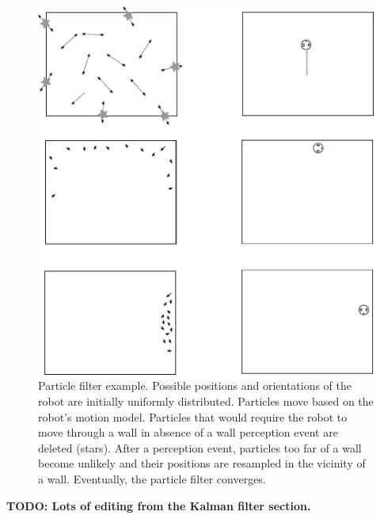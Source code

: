 \begin{figure}
	\centering
		\includegraphics[width=\textwidth]{figs/particlefilter_example}
	\caption{Particle filter example. Possible positions and orientations of the robot are initially uniformly distributed. Particles move based on the robot's motion model. Particles that would require the robot to move through a wall in absence of a wall perception event are deleted (stars). After a perception event, particles too far of a wall become unlikely and their positions are resampled in the vicinity of a wall. Eventually, the particle filter converges.}
	\label{fig:particlefilter_example}
\end{figure}

\textbf{TODO: Lots of editing from the Kalman filter section.}


